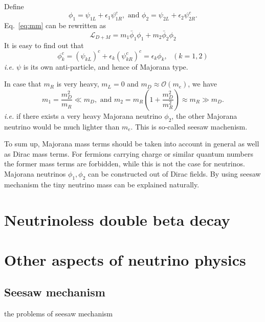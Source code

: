 Define
\begin{equation}
  \label{eq:mafi}
  \phi_{1} = \psi_{1L} + \epsilon_{1}\psi^{c}_{1R}, 
  \mbox{\ \ \ and \ \ \ }
  \phi_{2} = \psi_{2L} + \epsilon_{2}\psi^{c}_{2R}.
\end{equation}
Eq.~\ref{eq:mm} can be rewritten as
\begin{equation}
  \label{eq:mv}
  \mathcal{L}_{D+M} = m_{1}\bar{\phi}_{1}\phi_{1} + m_{2}\bar{\phi}_{2}\phi_{2}
\end{equation}
It is easy to find out that
\begin{equation}
  \label{eq:mach}
  \phi^{c}_{k} = (\psi_{kL})^{c} + \epsilon_{k}(\psi^{c}_{kR})^{c} = \epsilon_{k}\phi_{k}, ~~~ (k=1,2)
\end{equation}
\textit{i.e.} $\psi$ is its own anti-particle, and hence of Majorana type.

In case that $m_{R}$ is very heavy, $m_{L} = 0$ and $m_{D} \approx \mathcal{O}(m_{e})$, we have
\begin{equation}
  \label{eq:seesaw}
  m_{1} = \frac{m^{2}_{D}}{m_{R}}\ll m_{D},  \mbox{\ \ \ and \ \ \ }   m_{2} = m_{R}(1+\frac{m^{2}_{D}}{m^{2}_{R}}) \approx m_{R} \gg m_{D}.
\end{equation}
\textit{i.e.} if there exists a very heavy Majorana neutrino $\phi_2$, the other Majorana neutrino would be much lighter than $m_e$. This is so-called seesaw machenism.

To sum up, Majorana mass terms should be taken into account in general as well as Dirac mass terms. For fermions carrying charge or similar quantum numbers the former mass terms are forbidden, while this is not the case for neutrinos. Majorana neutrinos $\phi_{1}, \phi_{2}$ can be constructed out of Dirac fields. By using seesaw mechanism the tiny neutrino mass can be explained naturally.

\section{Neutrinoless double beta decay}
\label{sec:0n2b}


\section{Other aspects of neutrino physics}
\label{sec:others}

\subsection{Seesaw mechanism}
\label{sec:seesaw}
the problems of seesaw mechanism

